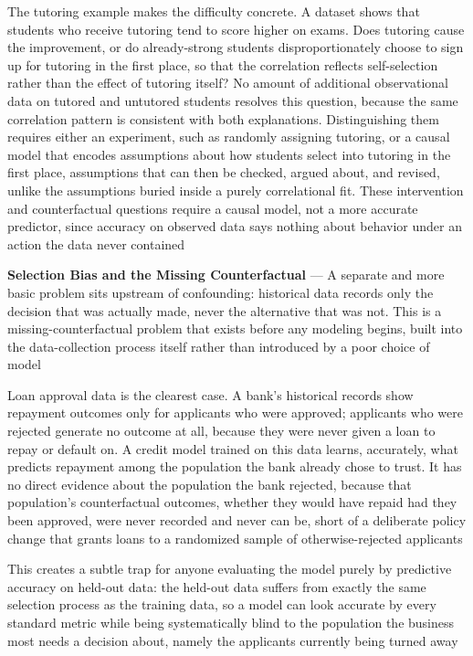 The tutoring example makes the difficulty concrete. A dataset shows that
students who receive tutoring tend to score higher on exams. Does tutoring cause
the improvement, or do already-strong students disproportionately choose to sign
up for tutoring in the first place, so that the correlation reflects self-selection
rather than the effect of tutoring itself? No amount of additional observational
data on tutored and untutored students resolves this question, because the same correlation
pattern is consistent with both explanations. Distinguishing them requires
either an experiment, such as randomly assigning tutoring, or a causal model
that encodes assumptions about how students select into tutoring in the first
place, assumptions that can then be checked, argued about, and revised, unlike
the assumptions buried inside a purely correlational fit. These intervention and
counterfactual questions require a causal model, not a more accurate predictor, since
accuracy on observed data says nothing about behavior under an action the data never
contained

\textbf{Selection Bias and the Missing Counterfactual} --- A separate and more basic
problem sits upstream of confounding: historical data records only the decision
that was actually made, never the alternative that was not. This is a missing-counterfactual
problem that exists before any modeling begins, built into the data-collection process
itself rather than introduced by a poor choice of model

Loan approval data is the clearest case. A bank's historical records show repayment
outcomes only for applicants who were approved; applicants who were rejected
generate no outcome at all, because they were never given a loan to repay or default
on. A credit model trained on this data learns, accurately, what predicts
repayment among the population the bank already chose to trust. It has no direct
evidence about the population the bank rejected, because that population's
counterfactual outcomes, whether they would have repaid had they been approved,
were never recorded and never can be, short of a deliberate policy change that grants
loans to a randomized sample of otherwise-rejected applicants

This creates a subtle trap for anyone evaluating the model purely by predictive
accuracy on held-out data: the held-out data suffers from exactly the same selection
process as the training data, so a model can look accurate by every standard
metric while being systematically blind to the population the business most
needs a decision about, namely the applicants currently being turned away

